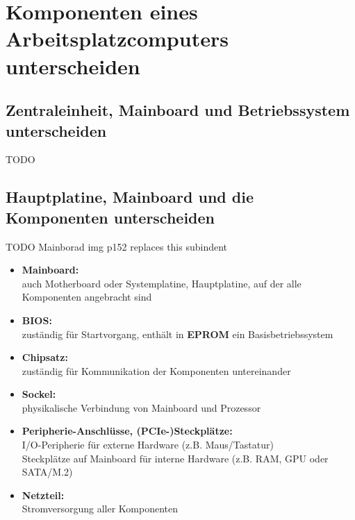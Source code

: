 \section{Komponenten eines Arbeitsplatzcomputers unterscheiden}
\subsection{Zentraleinheit, Mainboard und Betriebssystem unterscheiden}
    TODO

\subsection{Hauptplatine, Mainboard und die Komponenten unterscheiden}
    \begin{subindent}
        TODO Mainborad img p152 replaces this subindent
    \end{subindent}
    
    \begin{subindent}
        \begin{itemize}[leftmargin=2.5cm, topsep=0.2em, itemsep=0.1em, parsep=0.3em]
            \item \textbf{Mainboard:} \\
                  auch Motherboard oder Systemplatine, Hauptplatine, auf der alle Komponenten angebracht sind
            \item \textbf{BIOS:} \\
                  zuständig für Startvorgang, enthält in \textbf{EPROM} ein Basisbetriebssystem
            \item \textbf{Chipsatz:} \\
                  zuständig für Kommunikation der Komponenten untereinander
            \item \textbf{Sockel:} \\
                  physikalische Verbindung von Mainboard und Prozessor
            \item \textbf{Peripherie-Anschlüsse, (PCIe-)Steckplätze:} \\
                  I/O-Peripherie für externe Hardware (z.B. Maus/Tastatur) \\
                  Steckplätze auf Mainboard für interne Hardware (z.B. RAM, GPU oder SATA/M.2)
            \item \textbf{Netzteil:} \\
                  Stromversorgung aller Komponenten
        \end{itemize}
    \end{subindent}
    
